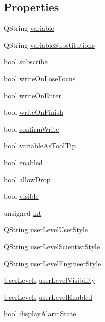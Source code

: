 \subsection*{Properties}
\begin{DoxyCompactItemize}
\item 
QString \hyperlink{classQEGenericEdit_a4d5d7d260857021e0714ec47e0bba9f7}{variable}
\item 
QString \hyperlink{classQEGenericEdit_a4cbf09c0d505553217dc9880d0987382}{variableSubstitutions}
\item 
bool \hyperlink{classQEGenericEdit_a3cb8e9d1d34565e89d1c484504975fb5}{subscribe}
\item 
bool \hyperlink{classQEGenericEdit_a2da40951e678a9e31413b87b45d59c64}{writeOnLoseFocus}
\item 
bool \hyperlink{classQEGenericEdit_a4555b5e4928e65bde2f522e26078fa84}{writeOnEnter}
\item 
bool \hyperlink{classQEGenericEdit_a72daabd68fba3750b5633a9ec610e5d3}{writeOnFinish}
\item 
bool \hyperlink{classQEGenericEdit_ab04f43d93b0c5d813cd5f85c5069d4bd}{confirmWrite}
\item 
bool \hyperlink{classQEGenericEdit_a9173bf85137b00076d02c7d1f88323f9}{variableAsToolTip}
\item 
bool \hyperlink{classQEGenericEdit_a7f543d99ef8b0b0ab2550b9e9f6cbbce}{enabled}
\item 
bool \hyperlink{classQEGenericEdit_ad9a855d077672a0728845f478445b1b0}{allowDrop}
\item 
bool \hyperlink{classQEGenericEdit_af3d5533b501f2d763431cb1b5b2aa7e0}{visible}
\item 
unsigned \hyperlink{classQEGenericEdit_a9e520be7f9bbbede4efc7fb4c9cebd9d}{int}
\item 
QString \hyperlink{classQEGenericEdit_a13421ac7b96c448d3ed92d69713b52d5}{userLevelUserStyle}
\item 
QString \hyperlink{classQEGenericEdit_a98fef02145d98961debe3cdc8fa8cb9c}{userLevelScientistStyle}
\item 
QString \hyperlink{classQEGenericEdit_ab4d7c33ffbce0d809dc4fc078e99f924}{userLevelEngineerStyle}
\item 
\hyperlink{classQEGenericEdit_a0d4ee4dc910113b53e1396e0736f28b7}{UserLevels} \hyperlink{classQEGenericEdit_a7f0733266f39549d361cdf65e34ebd30}{userLevelVisibility}
\item 
\hyperlink{classQEGenericEdit_a0d4ee4dc910113b53e1396e0736f28b7}{UserLevels} \hyperlink{classQEGenericEdit_ae18520d83fec62603db7e658efe00e3c}{userLevelEnabled}
\item 
bool \hyperlink{classQEGenericEdit_a663da3081feabe1b0d0194a4e1e744f8}{displayAlarmState}
\end{DoxyCompactItemize}


